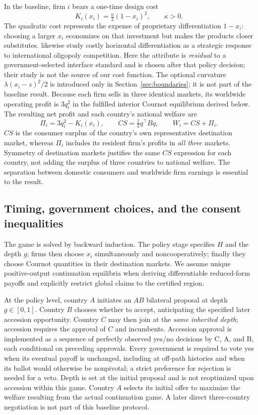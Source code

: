 \documentclass[11pt,a4paper]{article}
\theoremstyle{remark}\newtheorem{remark}[theorem]{Remark}
\begin{document}
In the baseline, firm $i$ bears a one-time design cost
\begin{equation}\label{eq:cost}
K_i(x_i)=\tfrac{\kappa}{2}(1-x_i)^2,\qquad\kappa>0.
\end{equation}
The quadratic cost represents the expense of proprietary differentiation $1-x_i$: choosing a larger $x_i$ economizes on that investment but makes the products closer substitutes. \citet{BranderSpencer2015} likewise study costly horizontal differentiation as a strategic response to international oligopoly competition. Here the attribute is \emph{residual} to a government-selected interface standard and is chosen after that policy decision; their study is not the source of our cost function. The optional curvature $\lambda(x_i-z)^2/2$ is introduced only in Section~\ref{sec:boundaries}; it is not part of the baseline result. Because each firm sells in three identical markets, its worldwide operating profit is $3q_i^2$ in the fulfilled interior Cournot equilibrium derived below. The resulting net profit and each country's national welfare are
\begin{equation}\label{eq:welfare}
\Pi_i=3q_i^2-K_i(x_i),\qquad CS=\tfrac12q^{\top}Bq,\qquad W_i=CS+\Pi_i.
\end{equation}
$CS$ is the consumer surplus of the country's own representative destination market, whereas $\Pi_i$ includes its resident firm's profits in \emph{all three} markets. Symmetry of destination markets justifies the same $CS$ expression for each country, not adding the surplus of three countries to national welfare. The separation between domestic consumers and worldwide firm earnings is essential to the result.

\subsection{Timing, government choices, and the consent inequalities}
The game is solved by backward induction. The policy stage specifies $H$ and the depth $g$; firms then choose $x_i$ simultaneously and noncooperatively; finally they choose Cournot quantities in their destination markets. We assume unique positive-output continuation equilibria when deriving differentiable reduced-form payoffs and explicitly restrict global claims to the certified region.

At the policy level, country $A$ initiates an $AB$ bilateral proposal at depth $g\in[0,1]$. Country $B$ chooses whether to accept, anticipating the specified later accession opportunity. Country $C$ may then join at the \emph{same inherited depth}; accession requires the approval of $C$ and incumbents. Accession approval is implemented as a sequence of perfectly observed yes/no decisions by C, A, and B, each conditional on preceding approvals. Every government is required to vote yes when its eventual payoff is unchanged, including at off-path histories and when its ballot would otherwise be nonpivotal; a strict preference for rejection is needed for a veto. Depth is set at the initial proposal and is not reoptimized upon accession within this game. Country $A$ selects its initial offer to maximize the welfare resulting from the actual continuation game. A later direct three-country negotiation is not part of this baseline protocol.
\end{document}
